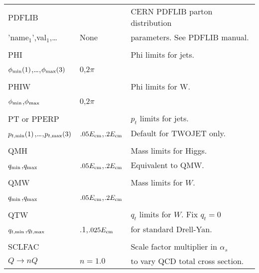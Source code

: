 \begin{center}
\begin{tabular}{lll}
PDFLIB                 &                   & CERN PDFLIB parton distribution\\
'name$_1$',val$_1$,\dots & None            & parameters. See PDFLIB manual. \\
                       &                   &                                \\
PHI                    &                   & Phi limits for jets.           \\
$\phi_{\rm min}(1)$,\dots,$\phi_{\rm max}(3)$ & 0,$2\pi$ &                  \\
                       &                   &                                \\
PHIW                   &                   & Phi limits for W.              \\
$\phi_{\rm min}$,$\phi_{\rm max}$ & 
0,$2\pi$                                   &                                \\
                       &                   &                                \\
PT or PPERP            &                   & $p_t$ limits for jets.         \\
$p_{t,{\rm min}}(1)$,\dots,$p_{t,{\rm max}}(3)$  & 
$.05E_{\rm cm}$,$.2E_{\rm cm}$             & Default for TWOJET only.       \\
                       &                   &                                \\
QMH                    &                   & Mass limits for Higgs.         \\
$q_{\rm min}$,$q_{\rm max}$ & 
$.05E_{\rm cm}$,$.2E_{\rm cm}$             & Equivalent to QMW.             \\
                       &                   &                                \\
QMW                    &                   & Mass limits for $W$.           \\
$q_{\rm min}$,$q_{\rm max}$ & 
$.05E_{\rm cm}$,$.2E_{\rm cm}$             &                                \\
                       &                   &                                \\
QTW                    &                   & $q_t$ limits for $W$. Fix 
$q_t=0$                                                                     \\
$q_{t,{\rm min}}$,$q_{t,{\rm max}}$ & 
.1,$.025E_{\rm cm}$                        & for standard Drell-Yan.        \\
                       &                   &                                \\
SCLFAC                 &                   & Scale factor multiplier in $\alpha_s$   \\
$Q\rightarrow nQ$      & $n=1.0$           & to vary QCD total cross section.   \\
\hline\hline
\end{tabular}
\end{center}

